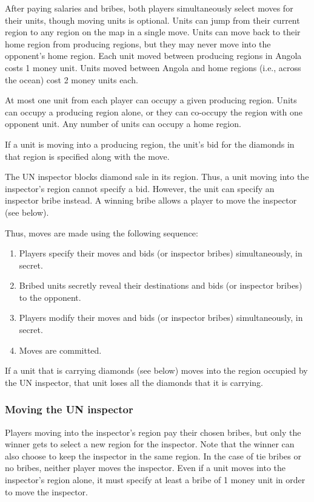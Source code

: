 \documentclass[12pt]{article}
\begin{document}
After paying salaries and bribes, both players simultaneously select moves for their units, though moving units is optional.  Units can jump from their current region to any region on the map in a single move.  Units can move back to their home region from producing regions, but they may never move into the opponent's home region.  Each unit moved between producing regions in Angola costs 1 money unit.  Units moved between Angola and home regions (i.e., across the ocean) cost 2 money units each.

At most one unit from each player can occupy a given producing region.  Units can occupy a producing region alone, or they can co-occupy the region with one opponent unit.  Any number of units can occupy a home region.  

If a unit is moving into a producing region, the unit's bid for the diamonds in that region is specified along with the move.

The UN inspector blocks diamond sale in its region.  Thus, a unit moving into the inspector's region cannot specify a bid.  However, the unit can specify an inspector bribe instead.  A winning bribe allows a player to move the inspector (see below).

Thus, moves are made using the following sequence:
\begin{enumerate}
\item Players specify their moves and bids (or inspector bribes) simultaneously, in secret.
\item Bribed units secretly reveal their destinations and bids (or inspector bribes) to the opponent.
\item Players modify their moves and bids (or inspector bribes) simultaneously, in secret.
\item Moves are committed.
\end{enumerate}

If a unit that is carrying diamonds (see below) moves into the region occupied by the UN inspector, that unit loses all the diamonds that it is carrying.


\subsubsection{Moving the UN inspector}
Players moving into the inspector's region pay their chosen bribes, but only the winner gets to select a new region for the inspector.  Note that the winner can also choose to keep the inspector in the same region.  In the case of tie bribes or no bribes, neither player moves the inspector.  Even if a unit moves into the inspector's region alone, it must specify at least a bribe of 1 money unit in order to move the inspector.
\end{document}
